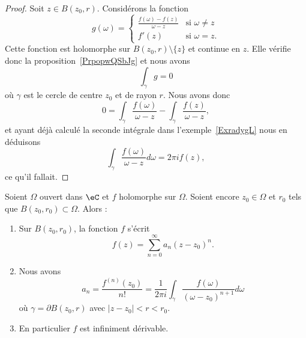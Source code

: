 \begin{proof}
	Soit \( z\in B(z_0,r)\). Considérons la fonction
	\begin{equation}
		g(\omega)=\begin{cases}
			\frac{ f(\omega)-f(z) }{ \omega-z } & \text{si } \omega\neq z \\
			f'(z)                               & \text{si } \omega=z.
		\end{cases}
	\end{equation}
	Cette fonction est holomorphe sur \( B(z_0,r)\setminus\{ z \}\) et continue en \( z\). Elle vérifie donc la proposition~\ref{PrpopwQSbJg} et nous avons
	\begin{equation}
		\int_{\gamma}g=0
	\end{equation}
	où \( \gamma\) est le cercle de centre \( z_0\) et de rayon \( r\). Nous avons donc
	\begin{equation}
		0=\int_{\gamma}\frac{ f(\omega) }{ \omega-z }-\int_{\gamma}\frac{ f(z) }{ \omega-z },
	\end{equation}
	et ayant déjà calculé la seconde intégrale dans l'exemple~\ref{ExradygL} nous en déduisons
	\begin{equation}
		\int_{\gamma}\frac{ f(\omega) }{ \omega-z }d\omega=2\pi if(z),
	\end{equation}
	ce qu'il fallait.
\end{proof}

\begin{theorem}     \label{ThomcPOdd}
	Soient \( \Omega\) ouvert dans \( \eC\) et \( f\) holomorphe sur \( \Omega\). Soient encore \( z_0\in \Omega\) et \( r_0\) tels que \( B(z_0,r_0)\subset \Omega\). Alors :
	\begin{enumerate}
		\item       \label{ITEMooYWSOooHJtxGr}
		      Sur \( B(z_0,r_0)\), la fonction \( f\) s'écrit
		      \begin{equation}
			      f(z)=\sum_{n=0}^{\infty}a_n(z-z_0)^n.
		      \end{equation}
		\item
		      Nous avons
		      \begin{equation}
			      a_n=\frac{ f^{(n)}(z_0) }{ n! }=\frac{1}{ 2\pi i }\int_{\gamma}\frac{ f(\omega) }{ (\omega-z_0)^{n+1} }d\omega
		      \end{equation}
		      où \( \gamma=\partial B(z_0,r)\) avec \( | z-z_0 |<r<r_0\).
		\item   \label{ItemMRRTooMChmuZ}
		      En particulier \( f\) est infiniment dérivable.
	\end{enumerate}
\end{theorem}

